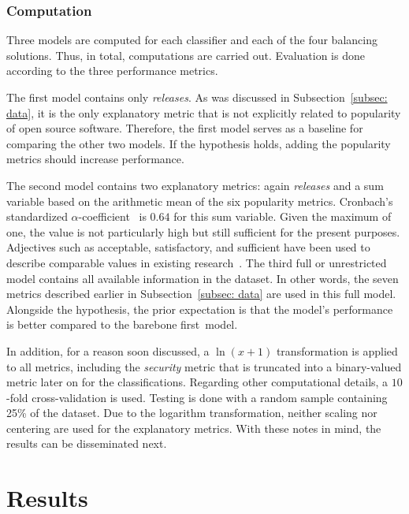 \documentclass[5p, twocolumn, numbers, sort]{elsarticle}
\begin{document}
\subsubsection{Computation}\label{subsec: computation}

Three models are computed for each classifier and each of the four balancing
solutions. Thus, in total,  computations are
carried out. Evaluation is done according to the three performance metrics.

The first model contains only \textit{releases}. As was discussed in
Subsection~\ref{subsec: data}, it is the only explanatory metric that is not
explicitly related to popularity of open source software. Therefore, the first
model serves as a baseline for comparing the other two models. If the hypothesis
holds, adding the popularity metrics should increase performance.

The second model contains two explanatory metrics: again \textit{releases} and a
sum variable based on the arithmetic mean of the six popularity
metrics. Cronbach's standardized $\alpha$-coefficient~\cite{Cronbach51} is
$0.64$ for this sum variable. Given the maximum of one, the value is not
particularly high but still sufficient for the present purposes. Adjectives such
as acceptable, satisfactory, and sufficient have been used to describe
comparable values in existing research~\cite{Taber17}. The third full or
unrestricted model contains all available information in the dataset. In other
words, the seven metrics described earlier in Subsection~\ref{subsec: data} are
used in this full model. Alongside the hypothesis, the prior expectation is that
the model's performance is better compared to the barebone first~model.

In addition, for a reason soon discussed, a $\ln(x + 1)$ transformation is
applied to all metrics, including the \textit{security} metric that is truncated
into a binary-valued metric later on for the classifications. Regarding other
computational details, a $10$-fold cross-validation is used. Testing is done
with a random sample containing 25\% of the dataset. Due to the logarithm
transformation, neither scaling nor centering are used for the explanatory
metrics. With these notes in mind, the results can be disseminated next.

\section{Results}\label{sec: results}
\end{document}
